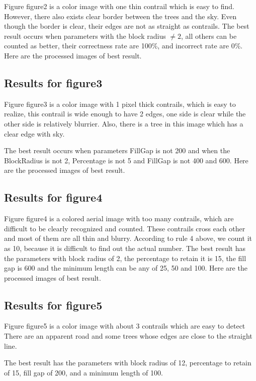 Figure figure2 is a color image with one thin contrail which is easy to find. 
However, there also exists clear border between the trees and the sky. Even 
though the border is clear, their edges are not as straight as contrails.
The best result occurs when parameters with the block radius $\neq 2$,
all others can be counted as better, their correctness rate are 100\%, 
and incorrect rate are 0\%. Here are the processed images of best result.

\subsection{Results for figure3}

Figure figure3 is a color image with 1 pixel thick contrails, which is easy 
to realize, this contrail is wide enough to have 2 edges, one side is clear while
the other side is relatively blurrier. Also, there is a tree in this image 
which has a clear edge with sky.

The best result occurs when parameters FillGap is not 200 and when the 
BlockRadius is not 2, Percentage is not 5 and FillGap is not 400 and 600.
Here are the processed images of best result.

\subsection{Results for figure4}

Figure figure4 is a colored aerial image with too many contrails, which are 
difficult to be clearly recognized and counted. These contrails cross each 
other and most of them are all thin and blurry. According to rule 4 above, 
we count it as 10, because it is difficult to find out the actual number. 
The best result has the parameters with block radius of 2, the percentage 
to retain it is 15, the fill gap is 600 and the minimum length can be any of 
25, 50 and 100. Here are the processed images of best result.

\subsection{Results for figure5}

Figure figure5 is a color image with about 3 contrails which are easy to detect
There are an apparent road and some trees whose edges are close to the straight line. 

The best result has the parameters with block radius of 12, percentage to retain
of 15, fill gap of 200, and a minimum length of 100.

